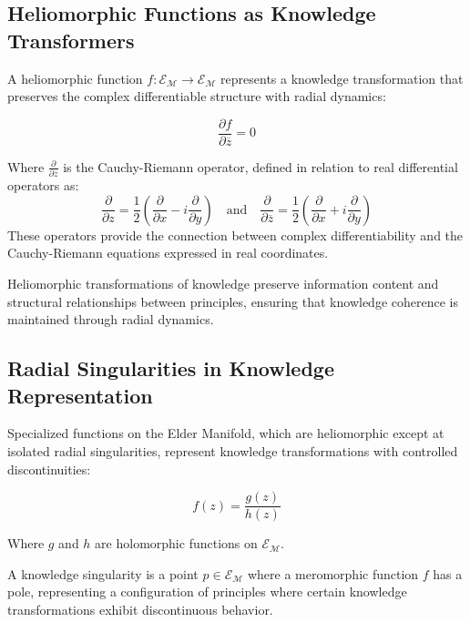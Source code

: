\subsection{Heliomorphic Functions as Knowledge Transformers}

A heliomorphic function $f: \mathcal{E}_{\mathcal{M}} \rightarrow \mathcal{E}_{\mathcal{M}}$ represents a knowledge transformation that preserves the complex differentiable structure with radial dynamics:

\begin{equation}
\frac{\partial f}{\partial \overline{z}} = 0
\end{equation}

Where $\frac{\partial}{\partial \overline{z}}$ is the Cauchy-Riemann operator, defined in relation to real differential operators as:
\begin{equation}
\frac{\partial}{\partial z} = \frac{1}{2}\left(\frac{\partial}{\partial x} - i\frac{\partial}{\partial y}\right) \quad \text{and} \quad \frac{\partial}{\partial \overline{z}} = \frac{1}{2}\left(\frac{\partial}{\partial x} + i\frac{\partial}{\partial y}\right)
\end{equation}
These operators provide the connection between complex differentiability and the Cauchy-Riemann equations expressed in real coordinates.

\begin{theorem}
Heliomorphic transformations of knowledge preserve information content and structural relationships between principles, ensuring that knowledge coherence is maintained through radial dynamics.
\end{theorem}

\subsection{Radial Singularities in Knowledge Representation}

Specialized functions on the Elder Manifold, which are heliomorphic except at isolated radial singularities, represent knowledge transformations with controlled discontinuities:

\begin{equation}
f(z) = \frac{g(z)}{h(z)}
\end{equation}

Where $g$ and $h$ are holomorphic functions on $\mathcal{E}_{\mathcal{M}}$.

\begin{definition}
A knowledge singularity is a point $p \in \mathcal{E}_{\mathcal{M}}$ where a meromorphic function $f$ has a pole, representing a configuration of principles where certain knowledge transformations exhibit discontinuous behavior.
\end{definition}

